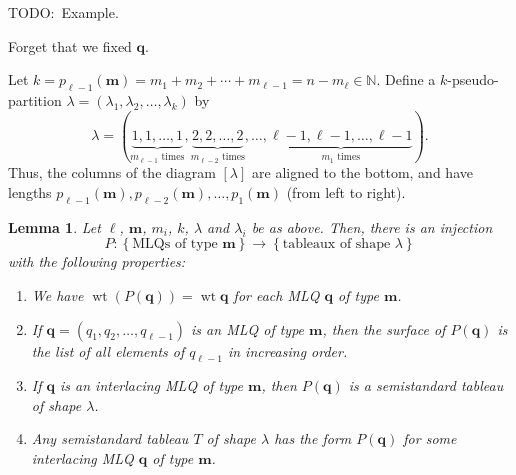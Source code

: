 \documentclass[reqno]{amsart}%
\newcommand{\0}{\phantom{c}}
\theoremstyle{plain}
\newtheorem{lemma}[thm]{Lemma}
\theoremstyle{definition}
\numberwithin{equation}{section}
\begin{document}
TODO:\ Example.

Forget that we fixed $\mathbf{q}$.

Let $k=p_{\ell-1}\left(  \mathbf{m}\right)  =m_{1}+m_{2}+\cdots+m_{\ell
-1}=n-m_{\ell}\in\mathbb{N}$. Define a $k$-pseudo-partition $\lambda=\left(
\lambda_{1},\lambda_{2},\ldots,\lambda_{k}\right)  $ by%
\begin{equation}
\lambda=\left(  \underbrace{1,1,\ldots,1}_{m_{\ell-1}\text{ times}%
},\underbrace{2,2,\ldots,2}_{m_{\ell-2}\text{ times}},\ldots,\underbrace{\ell
-1,\ell-1,\ldots,\ell-1}_{m_{1}\text{ times}}\right)  .
\label{eq.determinant_form.interlacing.lam}%
\end{equation}
Thus, the columns of the diagram $\left[  \lambda\right]  $ are aligned to the
bottom, and have lengths $p_{\ell-1}\left(  \mathbf{m}\right)  ,p_{\ell
-2}\left(  \mathbf{m}\right)  ,\ldots,p_{1}\left(  \mathbf{m}\right)  $ (from
left to right).

\begin{lemma}
\label{lem:determinant_form.bij1}Let $\ell$, $\mathbf{m}$, $m_{i}$, $k$,
$\lambda$ and $\lambda_{i}$ be as above. Then, there is an injection%
\[
P:\left\{  \text{MLQs of type }\mathbf{m}\right\}  \rightarrow\left\{
\text{tableaux of shape }\lambda\right\}
\]
with the following properties:

\begin{enumerate}
\item[(a)] We have $\operatorname*{wt}\left(  P\left(  \mathbf{q}\right)
\right)  =\operatorname*{wt}\mathbf{q}$ for each MLQ $\mathbf{q}$ of type
$\mathbf{m}$.

\item[(b)] If $\mathbf{q}=\left(  q_{1},q_{2},\ldots,q_{\ell-1}\right)  $ is
an MLQ of type $\mathbf{m}$, then the surface of $P\left(  \mathbf{q}\right)
$ is the list of all elements of $q_{\ell-1}$ in increasing order.

\item[(c)] If $\mathbf{q}$ is an interlacing MLQ of type $\mathbf{m}$, then
$P\left(  \mathbf{q}\right)  $ is a semistandard tableau of shape $\lambda$.

\item[(d)] Any semistandard tableau $T$ of shape $\lambda$ has the form
$P\left(  \mathbf{q}\right)  $ for some interlacing MLQ $\mathbf{q}$ of type
$\mathbf{m}$.
\end{enumerate}
\end{lemma}
\end{document}
